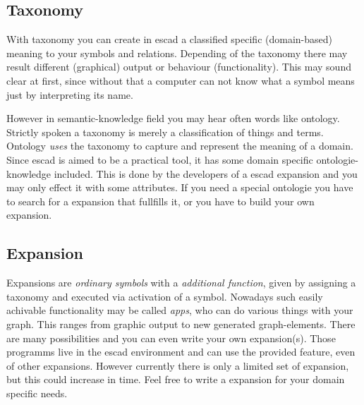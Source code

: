 \documentclass[a4paper, 12pt, openany]{scrbook}
\begin{document}
\subsection{Taxonomy}
With taxonomy you can create in escad a classified specific (domain-based) meaning to your symbols and relations. Depending of the taxonomy there may result different (graphical) output or behaviour (functionality). This may sound clear at first, since without that a computer can not know what a symbol means just by interpreting its name.

However in semantic-knowledge field you may hear often words like ontology. Strictly spoken a taxonomy is merely a classification of things and terms. Ontology \emph{uses} the taxonomy to capture and represent the meaning of a domain. Since escad is aimed to be a practical tool, it has some domain specific ontologie-knowledge included. This is done by the developers of a escad expansion and you may only effect it with some attributes. If you need a special ontologie you have to search for a expansion that fullfills it, or you have to build your own expansion.
\subsection{Expansion}
Expansions are \emph{ordinary symbols} with a \emph{additional function}, given by assigning a taxonomy and executed via activation of a symbol. Nowadays such easily achivable functionality may be called \emph{apps}, who can do various things with your graph. This ranges from graphic output to new generated graph-elements. There are many possibilities and you can even write your own expansion(s). Those programms live in the escad environment and can use the provided feature, even of other expansions. However currently there is only a limited set of expansion, but this could increase in time. Feel free to write a expansion for your domain specific needs.
\end{document}
